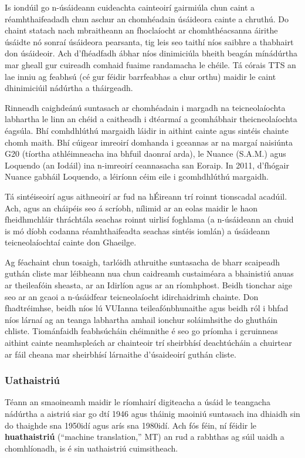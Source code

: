 \documentclass[]{../../metanetpaper}
\begin{document}
\begin{multicols}{2}
Is iondúil go n-úsáideann cuideachta cainteoirí gairmiúla chun caint a réamhthaifeadadh chun aschur an chomhéadain úsáideora cainte a chruthú. Do chaint statach nach mbraitheann an fhoclaíocht ar chomhthéacsanna áirithe úsáidte nó sonraí úsáideora pearsanta, tig leis seo taithí níos saibhre a thabhairt don úsáideoir. Ach d’fhéadfadh ábhar níos dinimiciúla bheith beagán mínádúrtha mar gheall gur cuireadh comhaid fuaime randamacha le chéile. Tá córais TTS an lae inniu ag feabhsú (cé gur féidir barrfeabhas a chur orthu) maidir le caint dhinimiciúil nádúrtha a tháirgeadh. 

Rinneadh caighdeánú suntasach ar chomhéadain i margadh na teicneolaíochta labhartha le linn an chéid a caitheadh i dtéarmaí a gcomhábhair theicneolaíochta éagsúla. Bhí comhdhlúthú margaidh láidir in aithint cainte agus sintéis chainte chomh maith. Bhí cúigear imreoirí domhanda i gceannas ar na margaí naisiúnta G20 (tíortha athléimneacha ina bhfuil daonraí arda), le Nuance (S.A.M.) agus Loquendo (an Iodáil) ina n-imreoirí ceannasacha san Eoraip.  In 2011, d’fhógair Nuance gabháil Loquendo, a léiríonn céim eile i gcomhdhlúthú margaidh.

Tá sintéiseoirí agus aithneoirí ar fud na hÉireann trí roinnt tionscadal acadúil. Ach, agus an cháipéis seo á scríobh, nílimid ar an eolas maidir le haon fheidhmchláir thráchtála seachas roinnt uirlisí foghlama (a n-úsáideann an chuid is mó díobh codanna réamhthaifeadta seachas sintéis iomlán) a úsáideann teicneolaíochtaí cainte don Ghaeilge.

Ag féachaint chun tosaigh, tarlóidh athruithe suntasacha de bharr scaipeadh guthán cliste mar léibheann nua chun caidreamh custaiméara a bhainistiú anuas ar theileafóin sheasta, ar an Idirlíon agus ar an ríomhphost. Beidh tionchar aige seo ar an gcaoi a n-úsáidfear teicneolaíocht idirchaidrimh chainte. Don fhadtréimhse, beidh níos lú VUIanna teileafónbhunaithe agus beidh ról i bhfad níos lárnaí ag an teanga labhartha amhail ionchur soláimhsithe do ghutháin chliste. Tiománfaidh feabhsúcháin chéimnithe é seo go príomha i gcruinneas aithint cainte neamhspleách ar chainteoir trí sheirbhísí deachtúcháin a chuirtear ar fáil cheana mar sheirbhísí lárnaithe d’úsaideoirí guthán cliste.


\subsubsection{Uathaistriú}

Téann an smaoineamh maidir le ríomhairí digiteacha a úsáid le teangacha nádúrtha a aistriú siar go dtí 1946 agus tháinig maoiniú suntasach ina dhiaidh sin do thaighde sna 1950idí agus arís sna 1980idí. Ach fós féin, ní féidir le \textbf{huathaistriú} (``machine translation,'' MT) an rud a rabhthas ag súil uaidh a chomhlíonadh, is é sin uathaistriú cuimsitheach. 


\end{multicols}
\end{document}
